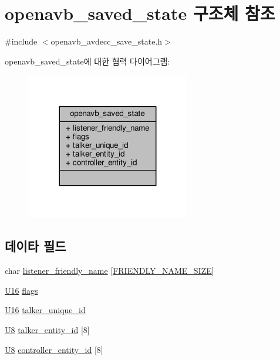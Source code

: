\hypertarget{structopenavb__saved__state}{}\section{openavb\+\_\+saved\+\_\+state 구조체 참조}
\label{structopenavb__saved__state}


{\ttfamily \#include $<$openavb\+\_\+avdecc\+\_\+save\+\_\+state.\+h$>$}



openavb\+\_\+saved\+\_\+state에 대한 협력 다이어그램\+:
\nopagebreak
\begin{figure}[H]
\begin{center}
\leavevmode
\includegraphics[width=203pt]{structopenavb__saved__state__coll__graph}
\end{center}
\end{figure}
\subsection*{데이타 필드}
\begin{DoxyCompactItemize}
\item 
char \hyperlink{structopenavb__saved__state_aeaaf1a5eb8e190e9385389bc81aadb39}{listener\+\_\+friendly\+\_\+name} \mbox{[}\hyperlink{tl_2openavb__tl__pub_8h_a29d83e67ee30c78c6ed81c188a433c10}{F\+R\+I\+E\+N\+D\+L\+Y\+\_\+\+N\+A\+M\+E\+\_\+\+S\+I\+ZE}\mbox{]}
\item 
\hyperlink{openavb__types__base__pub_8h_a0a0a322d5fa4a546d293a77ba8b4a71f}{U16} \hyperlink{structopenavb__saved__state_a492b33861e809623846e5256d271bc78}{flags}
\item 
\hyperlink{openavb__types__base__pub_8h_a0a0a322d5fa4a546d293a77ba8b4a71f}{U16} \hyperlink{structopenavb__saved__state_a545e994bde6218210bb41265ac298837}{talker\+\_\+unique\+\_\+id}
\item 
\hyperlink{openavb__types__base__pub_8h_aa63ef7b996d5487ce35a5a66601f3e73}{U8} \hyperlink{structopenavb__saved__state_a9a599b9c25c2171c3e76f269d9a04f51}{talker\+\_\+entity\+\_\+id} \mbox{[}8\mbox{]}
\item 
\hyperlink{openavb__types__base__pub_8h_aa63ef7b996d5487ce35a5a66601f3e73}{U8} \hyperlink{structopenavb__saved__state_a8b74ba582b9c19e1f2e475925f7cfb2f}{controller\+\_\+entity\+\_\+id} \mbox{[}8\mbox{]}
\end{DoxyCompactItemize}


